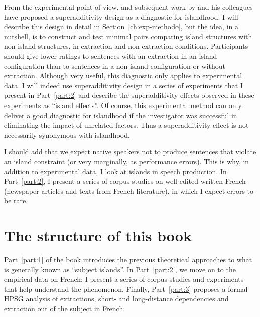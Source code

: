 From the experimental point of view, \citet{Sprouse.2007.PhD} and subsequent work by \citeauthor{Sprouse.2007.PhD} and his colleagues have proposed a superadditivity design as a diagnostic for islandhood. I will describe this design in detail in Section~\ref{ch:exp-methodo}, but the idea, in a nutshell, is to construct and test minimal pairs comparing island structures with non-island structures, in extraction and non-extraction conditions. Participants should give lower ratings to sentences with an extraction in an island configuration than to sentences in a non-island configuration or without extraction. Although very useful, this diagnostic only applies to experimental data. I will indeed use  superadditivity design in a series of experiments that I present in Part~\ref{part:2} and describe the superadditivity effects observed in these experiments as ``island effects''. Of course, this experimental method can only deliver a good diagnostic for islandhood if the investigator was successful in eliminating the impact of unrelated factors. Thus a superadditivity effect is not necessarily synonymous with islandhood. 

I should add that we expect native speakers not to produce sentences that violate an island constraint (or very marginally, as performance errors). This is why, in addition to experimental data, I look at islands in speech production. In Part~\ref{part:2}, I present a series of corpus studies on well-edited written French (newspaper articles and texts from French literature), in which I expect errors to be rare.

\section{The structure of this book}

Part~\ref{part:1} of the book introduces the previous theoretical approaches to what is generally known as ``subject islands''. In Part~\ref{part:2}, we move on to the empirical data on French: I present a series of corpus studies and experiments that help understand the phenomenon. Finally, Part~\ref{part:3} proposes a formal HPSG analysis of extractions, short- and long-distance dependencies and extraction out of the subject in French.


